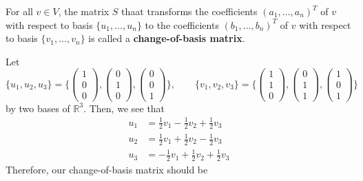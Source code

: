 	\begin{definition}
	  \label{def:change-of-basis-matrix}
		For all $v \in V$, the matrix $S$ thaat transforms the coefficients $(a_1, \ldots, a_n)^T$ of $v$ with respect to basis $\{u_1, \ldots, u_n\}$ to the coefficients $(b_1, \ldots, b_n)^T$ of $v$ with respect to basis $\{v_1, \ldots, v_n\}$ is called a \textbf{change-of-basis matrix}. 
	\end{definition}

	\begin{example}
	  \label{ex:computation-of-a-change-of-basis-matrix}
	  Let 
		\begin{equation}
			\{u_1, u_2, u_3 \} = \bigg\{ \begin{pmatrix} 1 \\ 0 \\ 0 \end{pmatrix}, \begin{pmatrix} 0 \\ 1 \\ 0 \end{pmatrix}, \begin{pmatrix} 0 \\ 0 \\ 1 \end{pmatrix} \bigg\}, \qquad \{v_1, v_2, v_3 \} = \bigg\{ \begin{pmatrix} 1 \\ 1 \\ 0 \end{pmatrix}, \begin{pmatrix} 0 \\ 1 \\ 1 \end{pmatrix}, \begin{pmatrix} 1 \\ 0 \\ 1 \end{pmatrix} \bigg\}
		\end{equation}
		by two bases of $\mathbb{R}^3$. Then, we see that 
		\begin{align}
			u_1 & = \frac{1}{2} v_1 - \frac{1}{2} v_2 + \frac{1}{2} v_3 \\ 
			u_2 & = \frac{1}{2} v_1 + \frac{1}{2} v_2 - \frac{1}{2} v_3 \\ 
			u_3 & = -\frac{1}{2} v_1 + \frac{1}{2} v_2 + \frac{1}{2} v_3 
		\end{align}
		Therefore, our change-of-basis matrix should be 
		\begin{equation}

\end{equation}
\end{example}
